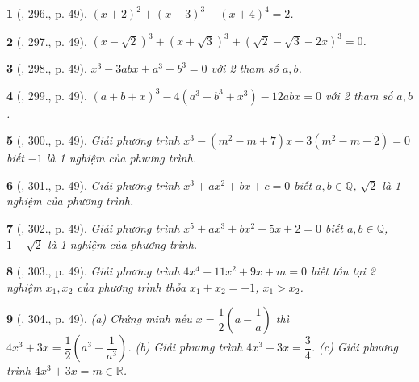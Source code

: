 \documentclass{article}
\newtheorem{baitoan}{}
\begin{document}
\begin{baitoan}[\cite{Binh_Toan_9_tap_2}, 296., p. 49]
	$(x + 2)^2 + (x + 3)^3 + (x + 4)^4 = 2$.
\end{baitoan}

\begin{baitoan}[\cite{Binh_Toan_9_tap_2}, 297., p. 49]
	$(x - \sqrt{2})^3 + (x + \sqrt{3})^3 + (\sqrt{2} - \sqrt{3} - 2x)^3 = 0$.
\end{baitoan}

\begin{baitoan}[\cite{Binh_Toan_9_tap_2}, 298., p. 49]
	$x^3 - 3abx + a^3 + b^3 = 0$ với 2 tham số $a,b$.
\end{baitoan}

\begin{baitoan}[\cite{Binh_Toan_9_tap_2}, 299., p. 49]
	$(a + b + x)^3 - 4(a^3 + b^3 + x^3) - 12abx = 0$ với 2 tham số $a,b$.
\end{baitoan}

\begin{baitoan}[\cite{Binh_Toan_9_tap_2}, 300., p. 49]
	Giải phương trình $x^3 - (m^2 - m + 7)x - 3(m^2 - m - 2) = 0$ biết $-1$ là 1 nghiệm của phương trình.
\end{baitoan}

\begin{baitoan}[\cite{Binh_Toan_9_tap_2}, 301., p. 49]
	Giải phương trình $x^3 + ax^2 + bx + c = 0$ biết $a,b\in\mathbb{Q}$, $\sqrt{2}$ là 1 nghiệm của phương trình.
\end{baitoan}

\begin{baitoan}[\cite{Binh_Toan_9_tap_2}, 302., p. 49]
	Giải phương trình $x^5 + ax^3 + bx^2 + 5x + 2 = 0$ biết $a,b\in\mathbb{Q}$, $1 + \sqrt{2}$ là 1 nghiệm của phương trình.
\end{baitoan}

\begin{baitoan}[\cite{Binh_Toan_9_tap_2}, 303., p. 49]
	Giải phương trình $4x^4 - 11x^2 + 9x + m = 0$ biết tồn tại 2 nghiệm $x_1,x_2$ của phương trình thỏa $x_1 + x_2 = -1$, $x_1 > x_2$.
\end{baitoan}

\begin{baitoan}[\cite{Binh_Toan_9_tap_2}, 304., p. 49]
	(a) Chứng minh nếu $x = \dfrac{1}{2}\left(a - \dfrac{1}{a}\right)$ thì $4x^3 + 3x = \dfrac{1}{2}\left(a^3 - \dfrac{1}{a^3}\right)$. (b) Giải phương trình $4x^3 + 3x = \dfrac{3}{4}$. (c) Giải phương trình $4x^3 + 3x = m\in\mathbb{R}$.
\end{baitoan}
\end{document}

